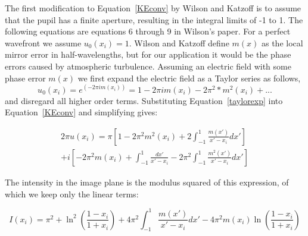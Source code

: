 The first modification to Equation~\ref{KEconv} by Wilson and Katzoff is to assume that the pupil has a finite aperture, resulting in the integral limits of -1 to 1. The following equations are equations 6 through 9 in Wilson's paper.\cite{wilson1975wavefront} For a perfect wavefront we assume $u_0 (x_i )=1$.  Wilson and Katzoff define $m(x)$ as the local mirror error in half-wavelengths, but for our application it would be the phase errors caused by atmospheric turbulence. Assuming an electric field with some phase error $m(x)$ we first expand the electric field as a Taylor series as follows,
\begin{equation}
    u_0 (x_i )=e^{(-2\pi i m(x_i ))}=1-2\pi i m(x_i )-2\pi^2*m^2 (x_i )+...
    \label{taylorexp}
\end{equation}
and disregard all higher order terms. Substituting Equation~\ref{taylorexp} into Equation~\ref{KEconv} and simplifying gives:

\begin{multline}
    2\pi u(x_i ) = 
    \pi 
    \left[ 
        1-2\pi^2 m^2 (x_i )+2\int_{-1}^1 \frac{m(x')}{x'-x_i} dx'
    \right] \\
    +   i \left[
        -2\pi^2 m(x_i)+\int_{-1}^1\frac{dx'}{x'-x_i}
        -
        2\pi^2\int_{-1}^1\frac{m^2(x')}{x'-x_i}dx'
    \right]
\end{multline}



The intensity in the image plane is the modulus squared of this expression, of which we keep only the linear terms:


\begin{equation}
    I(x_i) = \pi^2 + \ln^2 \left(
        \frac{1-x_i}{1+x_i}
    \right)
    +
    4 \pi^2 \int_{-1}^1 \frac{m(x')}{x'-x_i} dx'
    -
    4\pi^2 m(x_i) \ln\left(
        \frac{1-x_i}{1+x_i}
    \right)
\end{equation}

